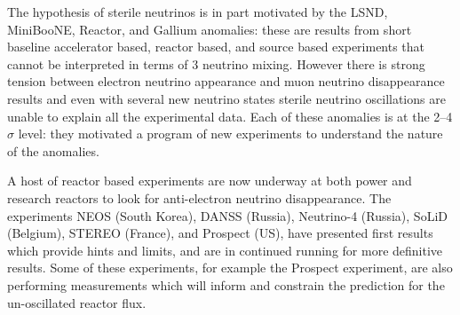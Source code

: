 
The hypothesis of sterile neutrinos is in part motivated by the LSND, MiniBooNE,
Reactor, and Gallium anomalies: these are results from short baseline accelerator based, reactor based, and source based experiments that cannot be interpreted in terms of 3 neutrino mixing.  
However there is strong tension between electron neutrino appearance and muon neutrino disappearance results and even with several new neutrino states
sterile neutrino oscillations
are unable to explain all the experimental data.
Each of these anomalies is at the 2--4\,$\sigma$ level: they motivated a program of  new experiments to understand the nature of the anomalies.  

A host of reactor based experiments are now underway at both power and research reactors to look for anti-electron neutrino disappearance.  %
The experiments NEOS (South Korea), DANSS (Russia), Neutrino-4 (Russia), SoLiD (Belgium), STEREO (France), and Prospect (US), have presented first results which provide hints and limits, and are in continued running for more definitive results.  Some of these experiments, for example the Prospect experiment, are also performing measurements which will inform and constrain the prediction for the un-oscillated reactor flux.   

